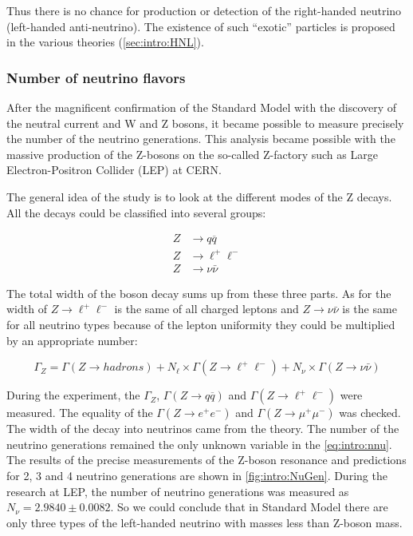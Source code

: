 \documentclass[../main.tex]{subfiles}
\begin{document}
Thus there is no chance for production or detection of the right-handed neutrino (left-handed anti-neutrino). The existence of such ``exotic'' particles is proposed in the various theories (\autoref{sec:intro:HNL}).

\subsubsection{Number of neutrino flavors}
\label{sec:intro:LEP}
After the magnificent confirmation of the Standard Model with the discovery of the neutral current and W and Z bosons, it became possible to measure precisely the number of the neutrino generations. This analysis became possible with the massive production of the Z-bosons on the so-called Z-factory such as Large Electron-Positron Collider (LEP) at CERN.

The general idea of the study is to look at the different modes of the Z decays. All the decays could be classified into several groups:

\begin{align}
Z&\to q\overline{q} \nonumber \\
Z&\to \ell^+\ell^- \\
Z&\to \nu\bar{\nu} \nonumber
\end{align}

The total width of the boson decay sums up from these three parts. As for the width of $Z\to \ell^+\ell^-$ is the same of all charged leptons and $Z\to \nu\bar{\nu}$ is the same for all neutrino types because of the lepton uniformity they could be multiplied by an appropriate number:

\begin{equation}
\Gamma_Z=\Gamma(Z\to hadrons)+N_{\ell}\times\Gamma(Z\to \ell^+\ell^-) + N_{\nu}\times\Gamma(Z\to \nu\bar{\nu})
\label{eq:intro:nnu}
\end{equation}

During the experiment, the $\Gamma_Z$, $\Gamma(Z\to q\overline{q})$ and $\Gamma(Z\to \ell^+\ell^-)$ were measured. The equality of the $\Gamma(Z\to e^+e^-)$ and $\Gamma(Z\to \mu^+\mu^-)$ was checked. The width of the decay into neutrinos came from the theory. The number of the neutrino generations remained the only unknown variable in the \autoref{eq:intro:nnu}. The results of the precise measurements of the Z-boson resonance and predictions for 2, 3 and 4 neutrino generations are shown in \autoref{fig:intro:NuGen}. During the research at LEP, the number of neutrino generations was measured as $N_{\nu}=2.9840\pm0.0082$. So we could conclude that in Standard Model there are only three types of the left-handed neutrino with masses less than Z-boson mass.
\end{document}
